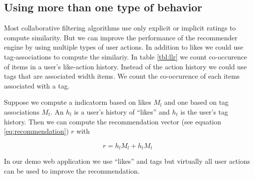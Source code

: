 \subsection{Using more than one type of behavior}
\label{sec:multimodal}

Most collaborative filtering algorithms use only explicit or implicit ratings to compute similarity.
But we can improve the performance of the recommender engine by using multiple types of user actions. In addition to likes we could use tag-associations to compute the similariy. In table \ref{tbl:llr} we count co-occurence of items in a user's like-action history. Instead of the action history we could use tags that are associated width items. We count the co-occurence of each items associated with a tag.

Suppose we compute a \gls{indicatorm} based on likes $M_l$ and one based on tag associations $M_t$. An $h_l$ is a user's history of ``likes'' and $h_t$ is the user's tag history. Then we can compute the recommendation vector (see equation \ref{eq:recommendation}) $r$ with

\begin{equation}
  \label{eq:multi}
  r = h_l M_l + h_t M_t
\end{equation}

In our demo web application we use ``likes'' and tags but virtually all user actions can be used to improve the recommendation.
